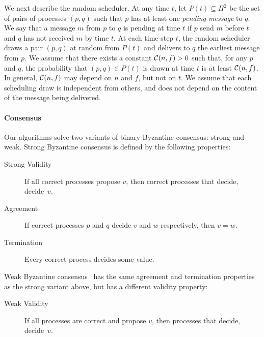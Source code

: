 We next describe the random scheduler. At any time $t$, let $P(t) \subseteq \Pi^2$ be the set of pairs of processes $(p,q)$ such that $p$ has at least one \textit{pending message} to $q$. We say that a message $m$ from $p$ to $q$ is pending at time $t$ if $p$ send $m$ before $t$ and $q$ has not received $m$ by time $t$. At each time step $t$, the random scheduler draws a pair $(p,q)$ at random from $P(t)$ and delivers to $q$ the earliest message from $p$. We assume that there exists a constant $\mathcal{C}(n,f) > 0$ such that, for any $p$ and $q$, the probability that $(p,q)\in P(t)$ is drawn at time $t$ is at least $\mathcal{C}(n,f)$. In general, $\mathcal{C}(n,f)$ may depend on $n$ and $f$, but not on $t$. We assume that each scheduling draw is independent from others, and does not depend on the content of the message being delivered. 

\paragraph{Consensus} Our algorithms solve two variants of binary Byzantine consensus: strong  and weak. Strong Byzantine consensus is defined by the following properties:
\begin{description}
    \item[Strong Validity] If all correct processes propose $v$, then correct processes that decide, decide~$v$. 
    \item[Agreement] If correct processes $p$ and $q$ decide $v$ and $w$ respectively, then $v = w$.
    \item[Termination] Every correct process decides some value.
\end{description}

Weak Byzantine consensus~\cite{weak-byz} has the same agreement and termination properties as the strong variant above, but has a different validity property:
\begin{description}
    \item[Weak Validity] If all processes are correct and propose $v$, then processes that decide, decide~$v$.
\end{description}

